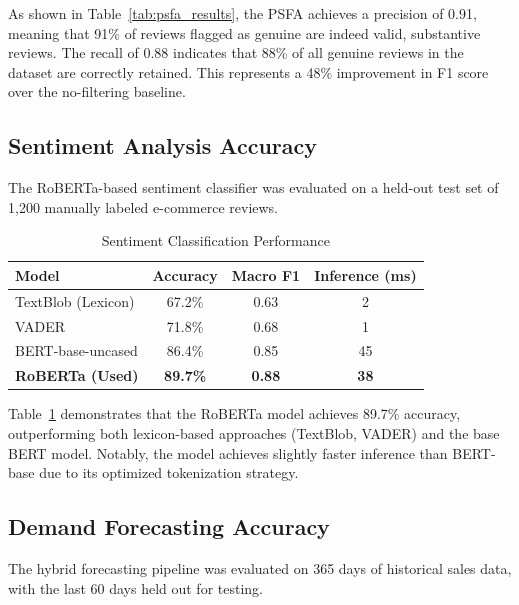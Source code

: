 \documentclass[conference]{IEEEtran}
\begin{document}
As shown in Table~\ref{tab:psfa_results}, the PSFA achieves a precision of 0.91, meaning that 91\% of reviews flagged as genuine are indeed valid, substantive reviews. The recall of 0.88 indicates that 88\% of all genuine reviews in the dataset are correctly retained. This represents a 48\% improvement in F1 score over the no-filtering baseline.

\subsection{Sentiment Analysis Accuracy}

The RoBERTa-based sentiment classifier was evaluated on a held-out test set of 1,200 manually labeled e-commerce reviews.

\begin{table}[htbp]
\caption{Sentiment Classification Performance}
\begin{center}
\begin{tabular}{lccc}
\toprule
\textbf{Model} & \textbf{Accuracy} & \textbf{Macro F1} & \textbf{Inference (ms)} \\
\midrule
TextBlob (Lexicon) & 67.2\% & 0.63 & 2 \\
VADER & 71.8\% & 0.68 & 1 \\
BERT-base-uncased & 86.4\% & 0.85 & 45 \\
\textbf{RoBERTa (Used)} & \textbf{89.7\%} & \textbf{0.88} & \textbf{38} \\
\bottomrule
\end{tabular}
\label{tab:sentiment_results}
\end{center}
\end{table}

Table~\ref{tab:sentiment_results} demonstrates that the RoBERTa model achieves 89.7\% accuracy, outperforming both lexicon-based approaches (TextBlob, VADER) and the base BERT model. Notably, the model achieves slightly faster inference than BERT-base due to its optimized tokenization strategy.

\subsection{Demand Forecasting Accuracy}

The hybrid forecasting pipeline was evaluated on 365 days of historical sales data, with the last 60 days held out for testing.
\end{document}
